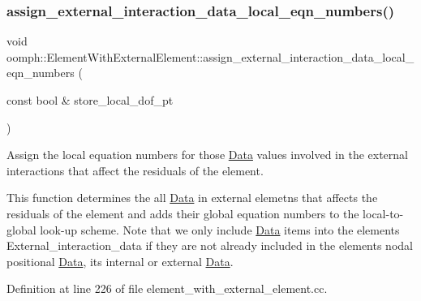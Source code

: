 \subsubsection{\texorpdfstring{assign\+\_\+external\+\_\+interaction\+\_\+data\+\_\+local\+\_\+eqn\+\_\+numbers()}{assign\_external\_interaction\_data\_local\_eqn\_numbers()}}
{\footnotesize\ttfamily void oomph\+::\+Element\+With\+External\+Element\+::assign\+\_\+external\+\_\+interaction\+\_\+data\+\_\+local\+\_\+eqn\+\_\+numbers (\begin{DoxyParamCaption}\item[{const bool \&}]{store\+\_\+local\+\_\+dof\+\_\+pt }\end{DoxyParamCaption})\hspace{0.3cm}{\ttfamily [protected]}}



Assign the local equation numbers for those \hyperlink{classoomph_1_1Data}{Data} values involved in the external interactions that affect the residuals of the element. 

This function determines the all \hyperlink{classoomph_1_1Data}{Data} in external elemetns that affects the residuals of the element and adds their global equation numbers to the local-\/to-\/global look-\/up scheme. Note that we only include \hyperlink{classoomph_1_1Data}{Data} items into the element\textquotesingle{}s External\+\_\+interaction\+\_\+data if they are not already included in the element\textquotesingle{}s nodal positional \hyperlink{classoomph_1_1Data}{Data}, its internal or external \hyperlink{classoomph_1_1Data}{Data}. 

Definition at line 226 of file element\+\_\+with\+\_\+external\+\_\+element.\+cc.



